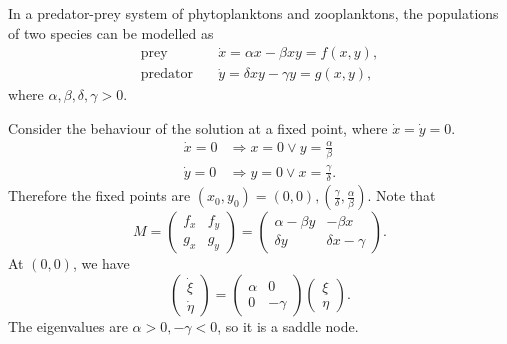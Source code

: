 \documentclass[a4paper]{article}
\begin{document}
    \begin{example}
        In a predator-prey system of phytoplanktons and zooplanktons, the populations of two species can be modelled as
        \begin{align*}
            \text{prey}\quad & \dot{x}=\alpha x- \beta xy=f(x,y),\\
            \text{predator}\quad & \dot{y} = \delta xy-\gamma y=g(x,y),
        \end{align*}
        where $ \alpha,\beta,\delta,\gamma>0 $.

        Consider the behaviour of the solution at a fixed point, where $ \dot{x}=\dot{y}=0 $.
        \begin{align*}
            \dot{x}=0 &\Longrightarrow x = 0 \lor y = \frac{\alpha}{\beta}\\
            \dot{y}=0& \Longrightarrow y = 0 \lor x = \frac{\gamma}{\delta}.
        \end{align*}
        Therefore the fixed points are $ (x_0,y_0)=(0,0), (\frac{\gamma}{\delta},\frac{\alpha}{\beta}) $. Note that 
        \[
            M=\begin{pmatrix}
                f_x&f_y\\
                g_x&g_y
            \end{pmatrix}=\begin{pmatrix}
                \alpha-\beta y&-\beta x\\
                \delta y&\delta x-\gamma
            \end{pmatrix}.
        \]
        At $(0,0)$, we have 
        \[
            \begin{pmatrix}
                \dot{\xi}\\\dot{\eta}
            \end{pmatrix} = \begin{pmatrix}
                \alpha&0\\
                0&-\gamma
            \end{pmatrix}\begin{pmatrix}
                \xi\\\eta
            \end{pmatrix}.
        \]
        The eigenvalues are $ \alpha>0,-\gamma<0 $, so it is a saddle node.


\end{example}
\end{document}
